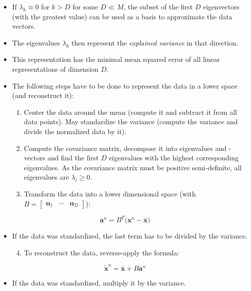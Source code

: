 \documentclass[a4paper, 11pt, accentcolor = tud3b]{tudreport}
\renewcommand{\vec}[1]{\mathbf{#1}}
\begin{document}
				\begin{itemize}
					\item If \( \lambda_k \approx 0 \) for \( k > D \) for some \( D \ll M \), the subset of the first \(D\) eigenvectors (with the greatest value) can be used as a basis to approximate the data vectors.
					\item The eigenvalues \(\lambda_k\) then represent the \emph{explained variance} in that direction.
					\item This representation has the minimal mean squared error of all linear representations of dimension \(D\).
					\item The following steps have to be done to represent the data in a lower space (and reconstruct it):
						\begin{enumerate}
							\item Center the data around the mean (compute it and subtract it from all data points). May standardize the variance (compute the variance and divide the normalized data by it).
							\item Compute the covariance matrix, decompose it into eigenvalues and -vectors and find the first \(D\) eigenvalues with the highest corresponding eigenvalues. As the covariance matrix must be positive semi-definite, all eigenvalues are \( \lambda_i \geq 0 \).
							\item Transform the data into a lower dimensional space (with \( B = \begin{bmatrix} \vec{u}_1 & \cdots & \vec{u}_D \end{bmatrix} \)):
						\end{enumerate}
				\end{itemize}
				\begin{equation}
					\vec{a}^n = B^T \big( \vec{x}^n - \bar{\vec{x}} \big)
				\end{equation}
				\begin{itemize}
					\item[] If the data was standardized, the last term has to be divided by the variance.
						\begin{enumerate}
							\setcounter{enumi}{3}
							\item To reconstruct the data, reverse-apply the formula:
						\end{enumerate}
				\end{itemize}
				\begin{equation}
					\tilde{\vec{x}}^n = \bar{\vec{x}} + B \vec{a}^n
				\end{equation}
				\begin{itemize}
					\item[] If the data was standardized, multiply it by the variance.
				\end{itemize}
			
\end{document}
